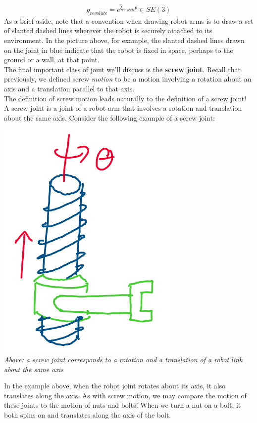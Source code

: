 \documentclass[oneside]{book}
\begin{document}
\begin{align}
    g_{revolute} = e^{\hat\xi_{revolute}\theta} \in SE(3)
\end{align}
As a brief aside, note that a convention when drawing robot arms is to draw a set of slanted dashed lines wherever the robot is securely attached to its environment. In the picture above, for example, the slanted dashed lines drawn on the joint in blue indicate that the robot is fixed in space, perhaps to the ground or a wall, at that point.\\
The final important class of joint we'll discuss is the \textbf{screw joint}. Recall that previously, we defined screw \textit{motion} to be a motion involving a rotation about an axis and a translation parallel to that axis.\\
The definition of screw motion leads naturally to the definition of a screw joint! A screw joint is a joint of a robot arm that involves a rotation and translation about the same axis. Consider the following example of a screw joint:
\begin{center}
    \includegraphics[scale=0.3]{images/screwJoint.png}\\
    \textit{Above: a screw joint corresponds to a rotation and a translation of a robot link about the same axis}
\end{center}
In the example above, when the robot joint rotates about its axis, it also translates along the axis. As with screw motion, we may compare the motion of these joints to the motion of nuts and bolts! When we turn a nut on a bolt, it both spins on and translates along the axis of the bolt.\\
\end{document}
